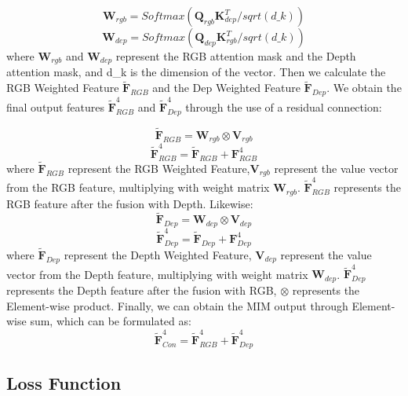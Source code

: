 \documentclass{aims}
\numberwithin{equation}{section}
\begin{document}
\begin{equation}
    \label{eq9}
    {\bm W}_{rgb} = Softmax({\bm Q}_{rgb}{\bm K}_{dep}^T / sqrt(d\_k))
\end{equation}
\begin{equation}
    \label{eq10}
    {\bm W}_{dep} = Softmax({\bm Q}_{dep}{\bm K}_{rgb}^T / sqrt(d\_k))
\end{equation}
where ${\bm W}_{rgb}$ and ${\bm W}_{dep}$ represent the RGB attention mask and the Depth attention mask, and d\_k is the dimension of the vector. Then we calculate the RGB Weighted Feature $\tilde{\bm F}_{RGB} $ and the Dep Weighted Feature $\tilde{\bm F}_{Dep} $. We obtain the final output features $\tilde{\bm F}_{RGB}^{4}$ and $\tilde{\bm F}_{Dep}^{4}$ through the use of a residual connection:

\begin{equation}
    \label{eq11}
    \tilde{\bm F}_{RGB}= {\bm W}_{rgb} \otimes {\bm V}_{rgb}
\end{equation}
\begin{equation}
    \label{eq12}
    \tilde{\bm F}_{RGB}^{4} = \tilde{\bm F}_{RGB} + {\bm F}_{RGB}^{4}
\end{equation}
where $\tilde{\bm F}_{RGB}$ represent the RGB Weighted Feature,${\bm V}_{rgb}$ represent the value vector from the RGB feature, multiplying with weight matrix ${\bm W}_{rgb}$. $\tilde{\bm F}_{RGB}^{4}$ represents the RGB feature after the fusion with Depth. Likewise:
\begin{equation}
    \label{eq13}
    \tilde{\bm F}_{Dep}= {\bm W}_{dep} \otimes {\bm V}_{dep}
\end{equation}
\begin{equation}
    \label{eq14}
    \tilde{\bm F}_{Dep}^{4} = \tilde{\bm F}_{Dep} + {\bm F}_{Dep}^{4}
\end{equation}
where $\tilde{\bm F}_{Dep}$ represent the Depth Weighted Feature, ${\bm V}_{dep}$ represent the value vector from the Depth feature, multiplying with weight matrix ${\bm W}_{dep}$. $\tilde{\bm F}_{Dep}^{4}$ represents the Depth feature after the fusion with RGB, $\otimes$ represents the Element-wise product. Finally, we can obtain the MIM output through Element-wise sum, which can be formulated as:
\begin{equation}
    \tilde{\bm F}_{Con}^{4} = \tilde{\bm F}_{RGB}^{4} + \tilde{\bm F}_{Dep}^{4}
\end{equation}

\subsection{Loss Function}
\end{document}
